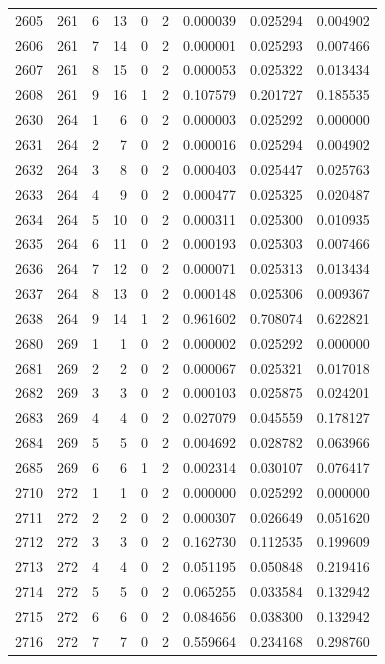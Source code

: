 \begin{longtable}{rrrrrrrrr}
2605 & 261 & 6 & 13 & 0 & 2 & 0.000039 & 0.025294 & 0.004902 \\
2606 & 261 & 7 & 14 & 0 & 2 & 0.000001 & 0.025293 & 0.007466 \\
2607 & 261 & 8 & 15 & 0 & 2 & 0.000053 & 0.025322 & 0.013434 \\
2608 & 261 & 9 & 16 & 1 & 2 & 0.107579 & 0.201727 & 0.185535 \\
2630 & 264 & 1 & 6 & 0 & 2 & 0.000003 & 0.025292 & 0.000000 \\
2631 & 264 & 2 & 7 & 0 & 2 & 0.000016 & 0.025294 & 0.004902 \\
2632 & 264 & 3 & 8 & 0 & 2 & 0.000403 & 0.025447 & 0.025763 \\
2633 & 264 & 4 & 9 & 0 & 2 & 0.000477 & 0.025325 & 0.020487 \\
2634 & 264 & 5 & 10 & 0 & 2 & 0.000311 & 0.025300 & 0.010935 \\
2635 & 264 & 6 & 11 & 0 & 2 & 0.000193 & 0.025303 & 0.007466 \\
2636 & 264 & 7 & 12 & 0 & 2 & 0.000071 & 0.025313 & 0.013434 \\
2637 & 264 & 8 & 13 & 0 & 2 & 0.000148 & 0.025306 & 0.009367 \\
2638 & 264 & 9 & 14 & 1 & 2 & 0.961602 & 0.708074 & 0.622821 \\
2680 & 269 & 1 & 1 & 0 & 2 & 0.000002 & 0.025292 & 0.000000 \\
2681 & 269 & 2 & 2 & 0 & 2 & 0.000067 & 0.025321 & 0.017018 \\
2682 & 269 & 3 & 3 & 0 & 2 & 0.000103 & 0.025875 & 0.024201 \\
2683 & 269 & 4 & 4 & 0 & 2 & 0.027079 & 0.045559 & 0.178127 \\
2684 & 269 & 5 & 5 & 0 & 2 & 0.004692 & 0.028782 & 0.063966 \\
2685 & 269 & 6 & 6 & 1 & 2 & 0.002314 & 0.030107 & 0.076417 \\
2710 & 272 & 1 & 1 & 0 & 2 & 0.000000 & 0.025292 & 0.000000 \\
2711 & 272 & 2 & 2 & 0 & 2 & 0.000307 & 0.026649 & 0.051620 \\
2712 & 272 & 3 & 3 & 0 & 2 & 0.162730 & 0.112535 & 0.199609 \\
2713 & 272 & 4 & 4 & 0 & 2 & 0.051195 & 0.050848 & 0.219416 \\
2714 & 272 & 5 & 5 & 0 & 2 & 0.065255 & 0.033584 & 0.132942 \\
2715 & 272 & 6 & 6 & 0 & 2 & 0.084656 & 0.038300 & 0.132942 \\
2716 & 272 & 7 & 7 & 0 & 2 & 0.559664 & 0.234168 & 0.298760 \\

\end{longtable}
